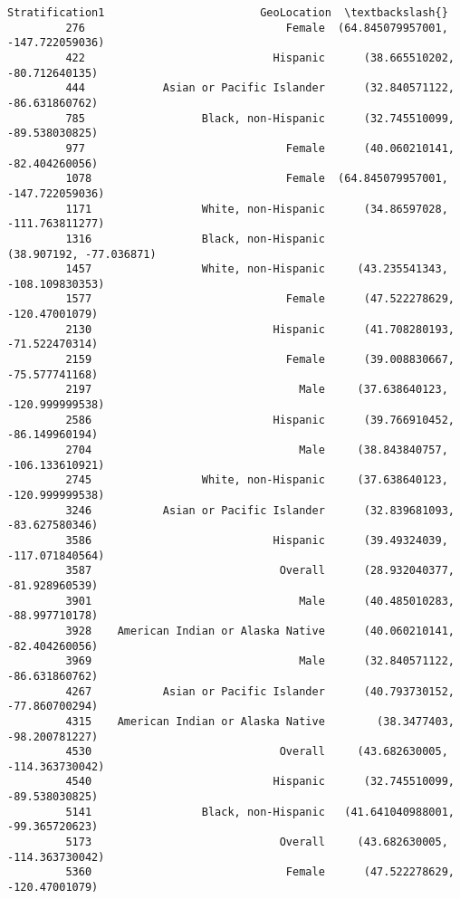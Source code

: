 \documentclass[11pt]{article}
\begin{document}
\begin{Verbatim}[commandchars=\\\{\}]
                                  Stratification1                        GeoLocation  \textbackslash{}
         276                               Female  (64.845079957001, -147.722059036)   
         422                             Hispanic      (38.665510202, -80.712640135)   
         444            Asian or Pacific Islander      (32.840571122, -86.631860762)   
         785                  Black, non-Hispanic      (32.745510099, -89.538030825)   
         977                               Female      (40.060210141, -82.404260056)   
         1078                              Female  (64.845079957001, -147.722059036)   
         1171                 White, non-Hispanic      (34.86597028, -111.763811277)   
         1316                 Black, non-Hispanic            (38.907192, -77.036871)   
         1457                 White, non-Hispanic     (43.235541343, -108.109830353)   
         1577                              Female      (47.522278629, -120.47001079)   
         2130                            Hispanic      (41.708280193, -71.522470314)   
         2159                              Female      (39.008830667, -75.577741168)   
         2197                                Male     (37.638640123, -120.999999538)   
         2586                            Hispanic      (39.766910452, -86.149960194)   
         2704                                Male     (38.843840757, -106.133610921)   
         2745                 White, non-Hispanic     (37.638640123, -120.999999538)   
         3246           Asian or Pacific Islander      (32.839681093, -83.627580346)   
         3586                            Hispanic      (39.49324039, -117.071840564)   
         3587                             Overall      (28.932040377, -81.928960539)   
         3901                                Male      (40.485010283, -88.997710178)   
         3928    American Indian or Alaska Native      (40.060210141, -82.404260056)   
         3969                                Male      (32.840571122, -86.631860762)   
         4267           Asian or Pacific Islander      (40.793730152, -77.860700294)   
         4315    American Indian or Alaska Native        (38.3477403, -98.200781227)   
         4530                             Overall     (43.682630005, -114.363730042)   
         4540                            Hispanic      (32.745510099, -89.538030825)   
         5141                 Black, non-Hispanic   (41.641040988001, -99.365720623)   
         5173                             Overall     (43.682630005, -114.363730042)   
         5360                              Female      (47.522278629, -120.47001079)   

\end{Verbatim}
\end{document}
